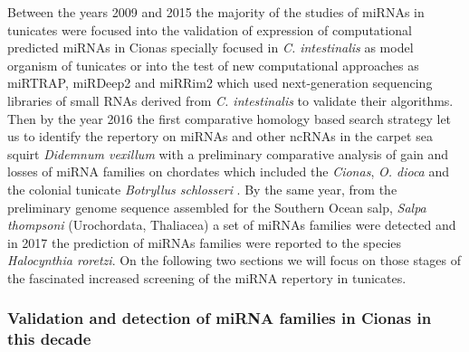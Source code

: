 \documentclass[graybox]{svmult}
\begin{document}
Between the years 2009 and 2015 the majority of the studies of miRNAs in 
tunicates were focused into the validation of expression of computational 
predicted miRNAs in Cionas specially focused in \textit{C. intestinalis} as 
model organism of tunicates or into the test of new computational approaches as 
miRTRAP, miRDeep2 and miRRim2 which used next-generation sequencing libraries of 
small RNAs derived from \textit{C. intestinalis} to validate their algorithms. 
Then by the year 2016 the first comparative homology based search strategy let 
us to identify the repertory on miRNAs and other ncRNAs in the carpet sea squirt 
\textit{Didemnum vexillum} with a preliminary comparative analysis of gain and 
losses of miRNA families on chordates which included the \textit{Cionas}, 
\textit{O. dioca} and the colonial tunicate \textit{Botryllus schlosseri} 
\cite{Velandia-Huerto2016}. By the same year, from the preliminary genome 
sequence assembled for the Southern Ocean salp, \textit{Salpa thompsoni} 
(Urochordata, Thaliacea) a set of miRNAs families were detected \cite{Jue2016} 
and in 2017 the prediction of miRNAs families were reported to the species 
\textit{Halocynthia roretzi}. On the following two sections we will focus on 
those stages of the fascinated increased screening of the miRNA repertory in 
tunicates.

\subsubsection{Validation and detection of miRNA families in Cionas in this decade}
\end{document}
